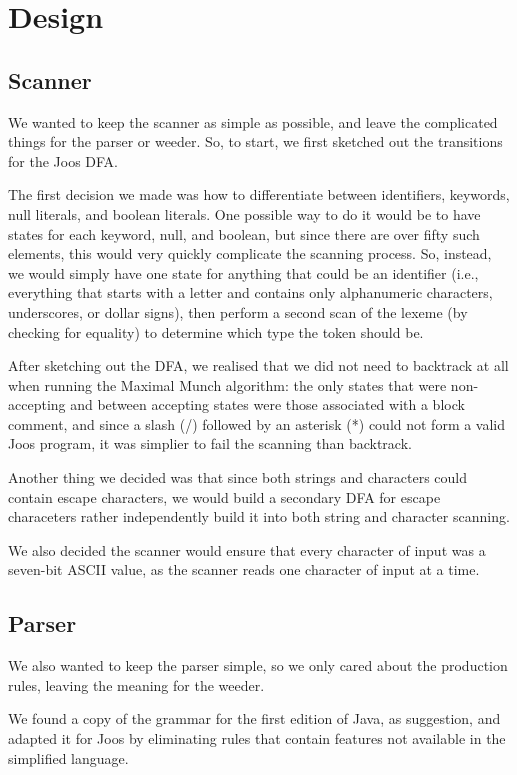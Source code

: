 \chapter{Design}
\section{Scanner}
We wanted to keep the scanner as simple as possible, and leave the complicated things for the parser or weeder.
So, to start, we first sketched out the transitions for the Joos DFA.

The first decision we made was how to differentiate between identifiers, keywords, null literals, and boolean literals.
One possible way to do it would be to have states for each keyword, null, and boolean,
  but since there are over fifty such elements, this would very quickly complicate the scanning process.
So, instead, we would simply have one state for anything that could be an identifier
  (i.e., everything that starts with a letter and contains only alphanumeric characters, underscores, or dollar signs),
  then perform a second scan of the lexeme (by checking for equality) to determine which type the token should be.

After sketching out the DFA, we realised that we did not need to backtrack at all when running the Maximal Munch algorithm:
  the only states that were non-accepting and between accepting states were those associated with a block comment,
  and since a slash (/) followed by an asterisk (*) could not form a valid Joos program,
  it was simplier to fail the scanning than backtrack.

Another thing we decided was that since both strings and characters could contain escape characters,
  we would build a secondary DFA for escape characeters rather independently build it into both string and character scanning.

We also decided the scanner would ensure that every character of input was a seven-bit ASCII value,
  as the scanner reads one character of input at a time.

\section{Parser}
We also wanted to keep the parser simple, so we only cared about the production rules, leaving the meaning for the weeder.

We found a copy of the grammar for the first edition of Java, as suggestion,
  and adapted it for Joos by eliminating rules that contain features not available in the simplified language.

